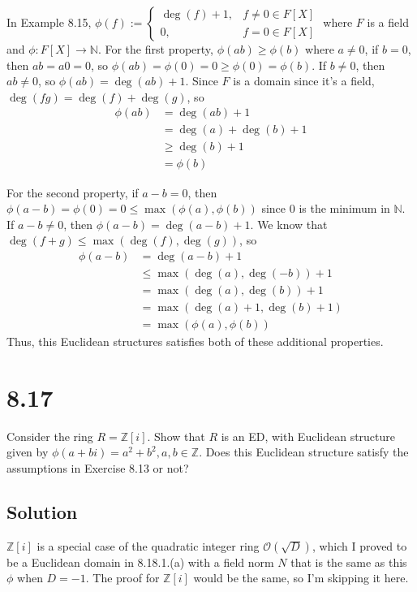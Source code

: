 \documentclass[fleqn]{article}
\begin{document}
        In Example 8.15, $\phi(f) := \begin{cases}
            \deg(f) + 1, &f \neq 0 \in F[X] \\
            0, &f = 0 \in F[X]
        \end{cases}$ where $F$ is a field and $\phi: F[X] \to \mathbb{N}$.  For the first property, $\phi(ab) \geq \phi(b)$ where $a \neq 0$, if $b = 0$, then $ab = a0 = 0$, so $\phi(ab) = \phi(0) = 0 \geq \phi(0) = \phi(b)$.  If $b \neq 0$, then $ab \neq 0$, so $\phi(ab) = \deg(ab) + 1$.  Since $F$ is a domain since it's a field, $\deg(fg) = \deg(f) + \deg(g)$, so 
        \begin{align}
            \phi(ab) &= \deg(ab) + 1 \\
                &= \deg(a) + \deg(b) + 1 \\
                &\geq \deg(b) + 1 \\
                &= \phi(b)
        \end{align}
        
        For the second property, if $a - b = 0$, then $\phi(a - b) = \phi(0) = 0 \leq \max(\phi(a), \phi(b))$ since 0 is the minimum in $\mathbb{N}$.  If $a - b \neq 0$, then $\phi(a - b) = \deg(a - b) + 1$.  We know that $\deg(f + g) \leq \max(\deg(f), \deg(g))$, so 
        \begin{align}
            \phi(a - b) &= \deg(a - b) + 1 \\
                &\leq \max(\deg(a), \deg(-b)) + 1 \\
                &= \max(\deg(a), \deg(b)) + 1 \\
                &= \max(\deg(a) + 1, \deg(b) + 1) \\
                &= \max(\phi(a), \phi(b))
        \end{align}
        Thus, this Euclidean structures satisfies both of these additional properties.
    
    \section{8.17}
    Consider the ring $R = \mathbb{Z}[i]$.  Show that $R$ is an ED, with Euclidean structure given by $\phi(a + bi) = a^2 + b^2, a, b \in \mathbb{Z}$.  Does this Euclidean structure satisfy the assumptions in Exercise 8.13 or not?
        
        \subsection{Solution}
        $\mathbb{Z}[i]$ is a special case of the quadratic integer ring $\mathcal{O}\left(\sqrt{D}\right)$, which I proved to be a Euclidean domain in 8.18.1.(a) with a field norm $N$ that is the same as this $\phi$ when $D = -1$.  The proof for $\mathbb{Z}[i]$ would be the same, so I'm skipping it here.
        
\end{document}
